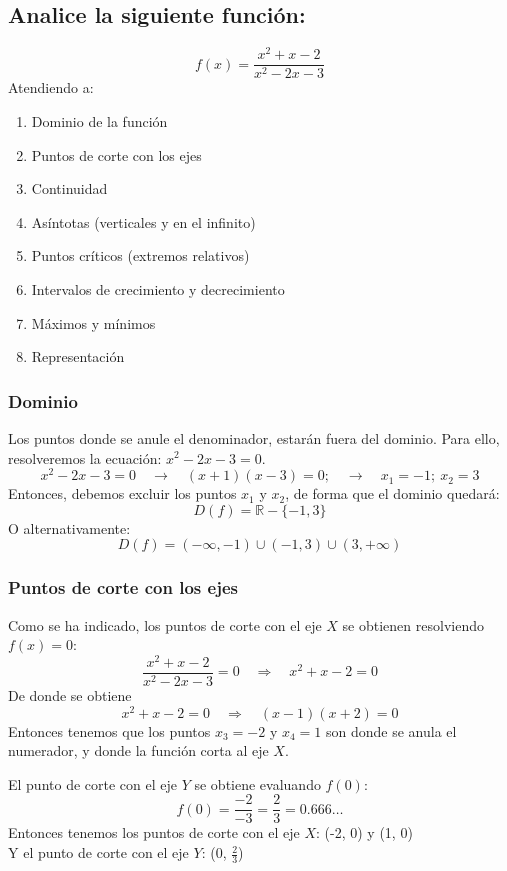 \documentclass[sans]{apuntes}
\begin{document}
\begin{examplebox}
	\subsection*{Analice la siguiente función:}
	\[f(x) = \frac{x^{2} + x - 2}{x^{2} - 2 x - 3}\]
	Atendiendo a:
	\begin{enumerate}[label=\bfseries\arabic*)]
		\item Dominio de la función
		\vspace{-0.5em}
		\item Puntos de corte con los ejes
		\vspace{-0.5em}
		\item Continuidad
		\vspace{-0.5em}
		\item Asíntotas (verticales y en el infinito)
		\vspace{-0.5em}
		\item Puntos críticos (extremos relativos)
		\vspace{-0.5em}
		\item Intervalos de crecimiento y decrecimiento
		\vspace{-0.5em}
		\item Máximos y mínimos
		\vspace{-0.5em}
		\item Representación
	\end{enumerate}

	\subsubsection*{Dominio}
	Los puntos donde se anule el denominador, estarán fuera del dominio. Para ello, resolveremos la ecuación: \(x^{2} - 2 x - 3 = 0\).
	\[x^{2} - 2 x - 3 = 0 \quad \to \quad (x + 1)(x - 3) = 0; \quad \to \quad x_1 = -1;\ x_2 = 3\]
	Entonces, debemos excluir los puntos $x_1$ y $x_2$, de forma que el dominio quedará:
	\[D(f) = \mathbb{R} - \{-1, 3\}\]
	O alternativamente:
	\[D(f) = (-\infty, -1)\cup(-1, 3)\cup(3, +\infty)\]

	\subsubsection*{Puntos de corte con los ejes}
	Como se ha indicado, los puntos de corte con el eje $X$ se obtienen resolviendo $f(x) = 0$:
	\[\frac{x^{2} + x - 2}{x^{2} - 2 x - 3} = 0 \quad \Longrightarrow \quad x^{2} + x - 2 = 0\]
	De donde se obtiene
	\[x^{2} + x - 2 = 0 \quad \Longrightarrow \quad (x-1)(x+2) = 0\]
	Entonces tenemos que los puntos $x_3 = -2$ y $x_4 = 1$ son donde se anula el numerador, y donde la función corta al eje $X$.
	\par El punto de corte con el eje $Y$ se obtiene evaluando $f(0)$:
	\[f(0) = \frac{-2}{-3} = \frac{2}{3} = 0.666\dots\]
	Entonces tenemos los puntos de corte con el eje $X$: (-2, 0) y (1, 0)\\
	Y el punto de corte con el eje $Y$: (0, $\frac{2}{3}$)


\end{examplebox}
\end{document}
